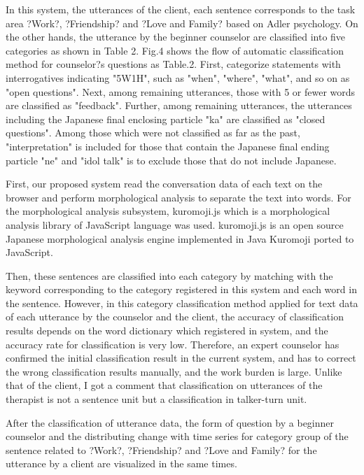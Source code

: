 \documentclass[review]{elsarticle}
\begin{document}
  In this system, the utterances of the client, each sentence corresponds to the task area ?Work?, ?Friendship? and ?Love and Family? based on Adler psychology. On the other hands, the utterance by the beginner counselor are classified into five categories as shown in Table 2.   Fig.4 shows the flow of automatic classification method for counselor?s questions as Table.2. First, categorize statements with interrogatives indicating "5W1H", such as "when", "where", "what", and so on as "open questions". Next, among remaining utterances, those with 5 or fewer words are classified as "feedback". Further, among remaining utterances, the utterances including the Japanese final enclosing particle "ka" are classified as "closed questions". Among those which were not classified as far as the past, "interpretation" is included for those that contain the Japanese final ending particle "ne" and "idol talk" is to exclude those that do not include Japanese.

First, our proposed system read the conversation data of each text on the browser and perform morphological analysis to separate the text into words. For the morphological analysis subsystem, kuromoji.js \cite{kuromojijs} which is a morphological analysis library of JavaScript language was used. kuromoji.js is an open source Japanese morphological analysis engine implemented in Java Kuromoji \cite{kuromoji} ported to JavaScript.

  Then, these sentences are classified into each category by matching with the keyword corresponding to the category registered in this system and each word in the sentence. However, in this category classification method applied for text data of each utterance by the counselor and the client, the accuracy of   classification results depends on the word dictionary which registered in system, and the accuracy rate for classification is very low. Therefore, an expert counselor has confirmed the initial classification result in the current system, and has to correct the wrong classification results manually, and the work burden is large. Unlike that of the client, I got a comment that classification on utterances of the therapist is not a sentence unit but a classification in talker-turn unit.

After the classification of utterance data, the form of question by a beginner counselor and the distributing change with time series for category group of the sentence related to ?Work?, ?Friendship? and ?Love and Family? for the utterance by a client are visualized in the same times.   
\end{document}

